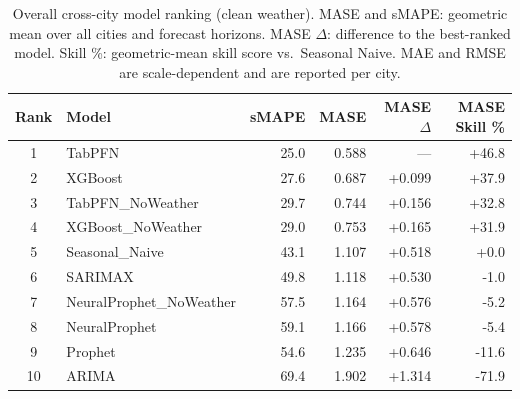 \begin{table}[ht!]
\centering
\caption{Overall cross-city model ranking (clean weather). MASE and sMAPE: geometric mean over all cities and forecast horizons. MASE \(\Delta\): difference to the best-ranked model. Skill \%: geometric-mean skill score vs.\ Seasonal Naive. MAE and RMSE are scale-dependent and are reported per city.}
\label{tab:cross_city_overall_ranking}
{\small\setlength{\tabcolsep}{4pt}\scriptsize
\begin{tabular}{clrrrr}
\toprule
Rank & Model & sMAPE & MASE & MASE \(\Delta\) & MASE Skill \% \\
\midrule
1 & TabPFN & 25.0 & 0.588 & --- & +46.8 \\
2 & XGBoost & 27.6 & 0.687 & +0.099 & +37.9 \\
3 & TabPFN\_NoWeather & 29.7 & 0.744 & +0.156 & +32.8 \\
4 & XGBoost\_NoWeather & 29.0 & 0.753 & +0.165 & +31.9 \\
5 & Seasonal\_Naive & 43.1 & 1.107 & +0.518 & +0.0 \\
6 & SARIMAX & 49.8 & 1.118 & +0.530 & -1.0 \\
7 & NeuralProphet\_NoWeather & 57.5 & 1.164 & +0.576 & -5.2 \\
8 & NeuralProphet & 59.1 & 1.166 & +0.578 & -5.4 \\
9 & Prophet & 54.6 & 1.235 & +0.646 & -11.6 \\
10 & ARIMA & 69.4 & 1.902 & +1.314 & -71.9 \\
\bottomrule
\end{tabular}
}
\end{table}

